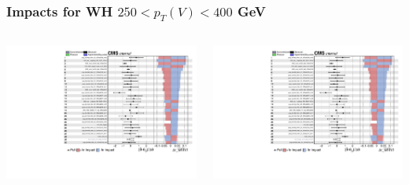 \documentclass{beamer}
\begin{document}
\begin{frame}
  \frametitle{Impacts for WH $250 < p_T(V) < 400$ GeV}
  \centering
  \begin{columns}
    \begin{column}{0.5\linewidth}
      \includegraphics[width=0.85\linewidth,page=1]{figures/impacts/impacts_r_whhi1.pdf}
    \end{column}
    \begin{column}{0.5\linewidth}
      \includegraphics[width=0.85\linewidth,page=2]{figures/impacts/impacts_r_whhi1.pdf}
    \end{column}
  \end{columns}
\end{frame}
\end{document}
